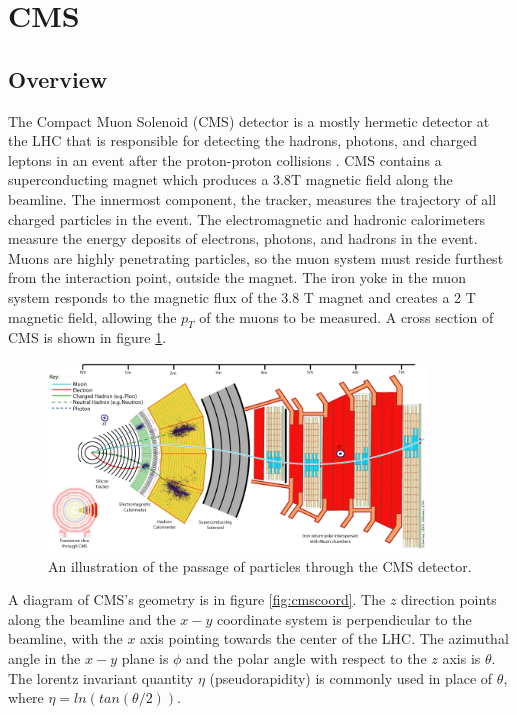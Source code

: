 \documentclass[oneside, letterpaper, oldfontcommands]{memoir}
\begin{document}
\section{CMS}\label{cms}
\subsection{Overview}

\qquad The Compact Muon Solenoid (CMS) detector is a mostly hermetic detector at the LHC that is responsible for detecting the hadrons, photons, and charged leptons in an event after the proton-proton collisions \cite{1748-0221-3-08-S08001}. CMS contains a superconducting magnet which produces a 3.8T magnetic field along the beamline. The innermost component, the tracker, measures the trajectory of all charged particles in the event. The electromagnetic and hadronic calorimeters measure the energy deposits of electrons, photons, and hadrons in the event. Muons are highly penetrating particles, so the muon system must reside furthest from the interaction point, outside the magnet. The iron yoke in the muon system responds to the magnetic flux of the 3.8 T magnet and creates a 2 T magnetic field, allowing the $p_{T}$ of the muons to be measured. A cross section of CMS is shown in figure \ref{fig:cmsxsec}. 

\begin{figure}[here]
\includegraphics[width=0.9\textwidth]{CMS_SLICE.png}
\caption{An illustration of the passage of particles through the CMS detector. \cite{CMS_SLICE}}
\label{fig:cmsxsec}
\end{figure}

\qquad A diagram of CMS's geometry is in figure \ref{fig:cmscoord}. The $z$ direction points along the beamline and the $x-y$ coordinate system is perpendicular to the beamline, with the $x$ axis pointing towards the center of the LHC. The azimuthal angle in the $x-y$ plane is $\phi$ and the polar angle with respect to the $z$ axis is $\theta$. The lorentz invariant quantity $\eta$ (pseudorapidity) is commonly used in place of $\theta$, where $\eta = ln(tan(\theta/2))$.
\end{document}
